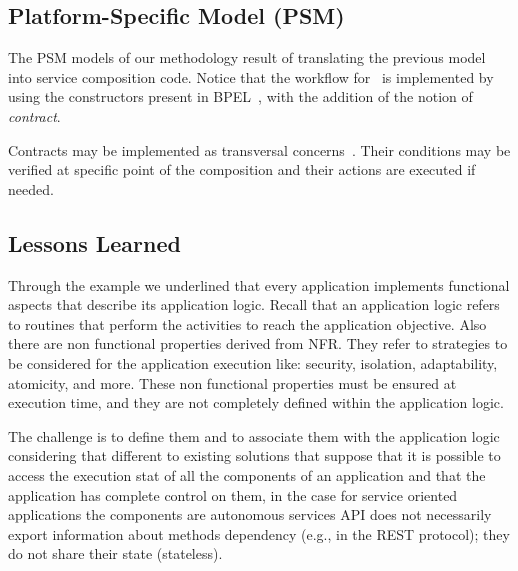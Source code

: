 \subsection{Platform-Specific Model (PSM)}

The  PSM models of our methodology result of translating the previous model into service composition code.
Notice that the workflow for \FlyingPig\ is implemented by using the constructors present in BPEL~\cite{BPEL}, with the addition of the notion of \textit{contract}.

Contracts may be implemented as transversal concerns~\cite{aspects}.
Their conditions may be verified at specific point of the composition and their actions are executed if needed.

\subsection{Lessons Learned}

Through the example we underlined that every application implements functional aspects that describe its application logic.
Recall that an application logic refers to routines that perform the activities to reach the application objective.
Also there are non functional properties derived from NFR. They refer to strategies to be considered for the application execution like: security, isolation, adaptability, atomicity, and more.
These non functional properties must be ensured at execution time, and they are not completely defined within the application logic.

The challenge is to define them and to associate them with the application logic considering that different to existing solutions that suppose that it is possible to access the execution stat of all the components  of an application and that the application has complete control on them, in the case for service oriented applications  the components are autonomous services
API does not necessarily export information about methods dependency (e.g., in the REST protocol);
they do not share their state (stateless).

